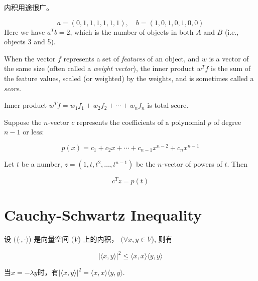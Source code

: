 内积用途很广。

\begin{example}[计算同时出现的项目数]
   \begin{equation}
a=(0,1,1,1,1,1,1), \quad b=(1,0,1,0,1,0,0)
\end{equation}
Here we have $ a^{T} b=2 $, which is the number of objects in both $ A $ and $ B $ (i.e., objects 3 and 5). 
\end{example}

\begin{example}
    When the vector $f$ represents a set of \textit{features} of
    an object, and $w$ is a vector of the same size (often called a \textit{weight vector}), the
    inner product $w^T f$ is the sum of the feature values, scaled (or weighted) by
    the weights, and is sometimes called a \textit{score}.

    Inner product $ w^{T} f=w_{1} f_{1}+w_{2} f_{2}+\cdots+w_{n} f_{n} $ is total score. 

\end{example}

\begin{example}[多项式]
    Suppose the $ n $-vector $ c $ represents the coefficients of a polynomial $ p $ of degree $ n-1 $ or less:

    \begin{equation} p(x)=c_{1}+c_{2} x+\cdots+c_{n-1} x^{n-2}+c_{n} x^{n-1} \end{equation}

    Let $t$ be a number, $ z=\left(1, t, t^{2}, \ldots, t^{n-1}\right) $  be the $n$-vector of powers
    of $t$. Then

    \begin{equation} c^{T} z=p(t) \end{equation}
\end{example}


\section{Cauchy-Schwartz Inequality}
\begin{theorem}
    \label{thm:cauchy-schwartz=inequality}
    设 $( \langle \cdot,\cdot \rangle $) 是向量空间 $( V $) 上的内积， $( \forall x, y \in V $), 则有

    \begin{equation}
|\langle x, y\rangle|^{2} \leq\langle x, x\rangle\langle y, y\rangle
\end{equation}

    当$x=-\lambda y$时，有$|\langle x, y\rangle|^{2}=\langle x, x\rangle\langle y, y\rangle$.
\end{theorem}


